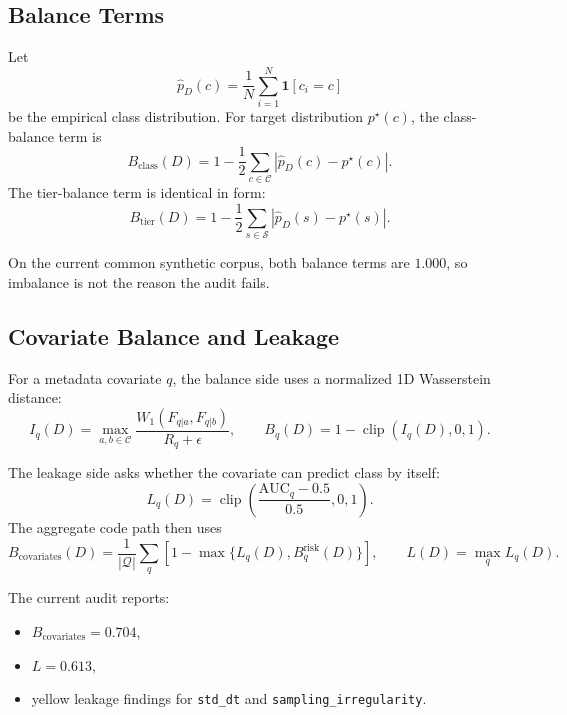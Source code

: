 \documentclass[11pt]{article}
\begin{document}
\subsection{Balance Terms}

Let
\begin{equation}
    \hat{p}_D(c)
    =
    \frac{1}{N}\sum_{i=1}^{N}\mathbf{1}[c_i=c]
\end{equation}
be the empirical class distribution. For target distribution \(p^\star(c)\),
the class-balance term is
\begin{equation}
    B_{\text{class}}(D)
    =
    1-\frac{1}{2}\sum_{c\in\mathcal{C}}
    \left|\hat{p}_D(c)-p^\star(c)\right|.
\end{equation}
The tier-balance term is identical in form:
\begin{equation}
    B_{\text{tier}}(D)
    =
    1-\frac{1}{2}\sum_{s\in\mathcal{S}}
    \left|\hat{p}_D(s)-p^\star(s)\right|.
\end{equation}

On the current common synthetic corpus, both balance terms are \(1.000\), so
imbalance is not the reason the audit fails.

\subsection{Covariate Balance and Leakage}

For a metadata covariate \(q\), the balance side uses a normalized 1D
Wasserstein distance:
\begin{equation}
    I_q(D)
    =
    \max_{a,b\in\mathcal{C}}
    \frac{W_1(F_{q|a},F_{q|b})}{R_q+\epsilon},
    \qquad
    B_q(D)=1-\operatorname{clip}(I_q(D),0,1).
\end{equation}

The leakage side asks whether the covariate can predict class by itself:
\begin{equation}
    L_q(D)
    =
    \operatorname{clip}
    \left(
    \frac{\mathrm{AUC}_q-0.5}{0.5},
    0,
    1
    \right).
\end{equation}
The aggregate code path then uses
\begin{equation}
    B_{\text{covariates}}(D)
    =
    \frac{1}{|\mathcal{Q}|}
    \sum_q
    \left[
    1-\max\{L_q(D), B_q^{\text{risk}}(D)\}
    \right],
    \qquad
    L(D)=\max_q L_q(D).
\end{equation}

The current audit reports:
\begin{itemize}[leftmargin=1.5em]
    \item \(B_{\text{covariates}} = 0.704\),
    \item \(L = 0.613\),
    \item yellow leakage findings for \texttt{std\_dt} and
    \texttt{sampling\_irregularity}.
\end{itemize}
\end{document}
